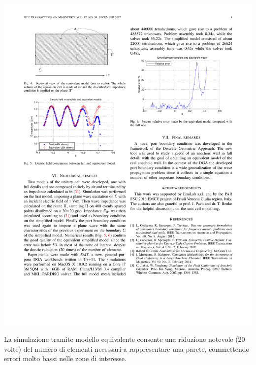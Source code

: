 \documentclass[portrait,fontscale=0.35,paperwidth=800mm, paperheight=1200mm]{baposter}
\begin{document}
\begin{poster}
{\begin{minipage}{\textwidth}
\begin{minipage}[b]{0.41\textwidth}
\begin{center}
                \includegraphics[width=\textwidth]{img/cell_section_equiv_poster.pdf}
                \label{fig:unitcell-sec-equiv}
            \end{center}
            \end{minipage}
            \hfill
        \end{minipage}
        
        \vspace{3mm}

        La simulazione tramite modello equivalente consente una riduzione notevole (20 volte) del numero di elementi necessari a rappresentare una parete, commettendo errori molto bassi nelle zone di interesse.

        \vspace{5mm}

}
\end{poster}
\end{document}
